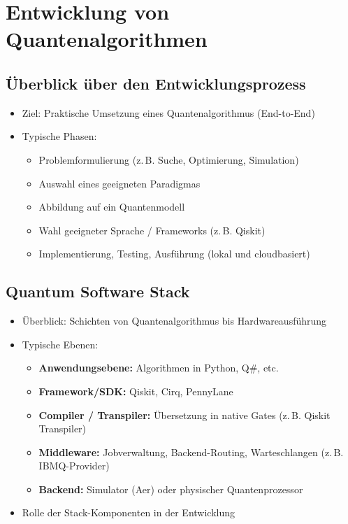 \section{Entwicklung von Quantenalgorithmen}

\subsection{Überblick über den Entwicklungsprozess}
\begin{itemize}
    \item Ziel: Praktische Umsetzung eines Quantenalgorithmus (End-to-End)
    \item Typische Phasen:
    \begin{itemize}
        \item Problemformulierung (z.\,B. Suche, Optimierung, Simulation)
        \item Auswahl eines geeigneten Paradigmas
        \item Abbildung auf ein Quantenmodell
        \item Wahl geeigneter Sprache / Frameworks (z.\,B. Qiskit)
        \item Implementierung, Testing, Ausführung (lokal und cloudbasiert)
    \end{itemize}
\end{itemize}

\subsection{Quantum Software Stack}
\begin{itemize}
    \item Überblick: Schichten von Quantenalgorithmus bis Hardwareausführung
    \item Typische Ebenen:
    \begin{itemize}
        \item \textbf{Anwendungsebene:} Algorithmen in Python, Q\#, etc.
        \item \textbf{Framework/SDK:} Qiskit, Cirq, PennyLane
        \item \textbf{Compiler / Transpiler:} Übersetzung in native Gates (z.\,B. Qiskit Transpiler)
        \item \textbf{Middleware:} Jobverwaltung, Backend-Routing, Warteschlangen (z.\,B. IBMQ-Provider)
        \item \textbf{Backend:} Simulator (Aer) oder physischer Quantenprozessor
    \end{itemize}
    \item Rolle der Stack-Komponenten in der Entwicklung
\end{itemize}

